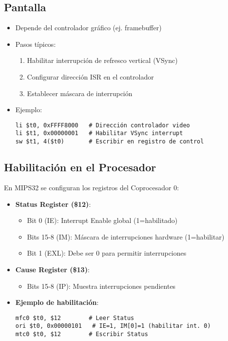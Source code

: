 \documentclass{article}
\begin{document}
\subsection{Pantalla}
\begin{itemize}
\item Depende del controlador gráfico (ej. framebuffer)
\item Pasos típicos:
  \begin{enumerate}
  \item Habilitar interrupción de refresco vertical (VSync)
  \item Configurar dirección ISR en el controlador
  \item Establecer máscara de interrupción
  \end{enumerate}
\item Ejemplo:
\begin{verbatim}
li $t0, 0xFFFF8000   # Dirección controlador video
li $t1, 0x00000001   # Habilitar VSync interrupt
sw $t1, 4($t0)       # Escribir en registro de control
\end{verbatim}
\end{itemize}

\subsection{Habilitación en el Procesador}

En MIPS32 se configuran los registros del Coprocesador 0:

\begin{itemize}
\item \textbf{Status Register (\$12)}:
  \begin{itemize}
  \item Bit 0 (IE): Interrupt Enable global (1=habilitado)
  \item Bits 15-8 (IM): Máscara de interrupciones hardware (1=habilitar)
  \item Bit 1 (EXL): Debe ser 0 para permitir interrupciones
  \end{itemize}

\item \textbf{Cause Register (\$13)}:
  \begin{itemize}
  \item Bits 15-8 (IP): Muestra interrupciones pendientes
  \end{itemize}

\item \textbf{Ejemplo de habilitación}:
\begin{verbatim}
mfc0 $t0, $12        # Leer Status
ori $t0, 0x00000101   # IE=1, IM[0]=1 (habilitar int. 0)
mtc0 $t0, $12        # Escribir Status
\end{verbatim}
\end{itemize}
\end{document}
